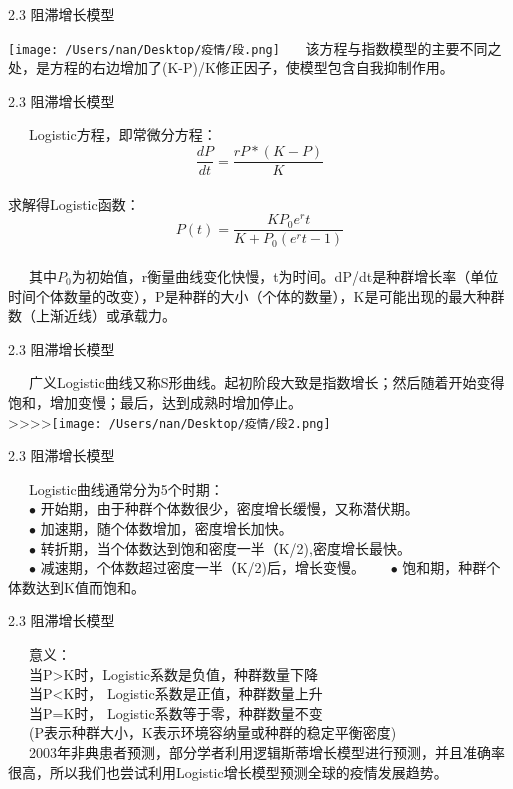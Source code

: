 \documentclass[
  ignorenonframetext,
]{beamer}
\begin{document}
\begin{frame}{2.3 阻滞增长模型}
\protect\hypertarget{section-9}{}

\texttt{[image: /Users/nan/Desktop/疫情/段.png]}
  该方程与指数模型的主要不同之处，是方程的右边增加了(K-P)/K修正因子，使模型包含自我抑制作用。

\end{frame}

\begin{frame}{2.3 阻滞增长模型}
\protect\hypertarget{section-10}{}

  Logistic方程，即常微分方程：
\[\frac {dP} {dt} =\frac  {rP*(K-P)} {K}\]\\
求解得Logistic函数： \[P(t)=\frac {KP_0 e^rt} {K+P_0(e^rt-1)}\]\\
  其中\(P_0\)为初始值，r衡量曲线变化快慢，t为时间。dP/dt是种群增长率（单位时间个体数量的改变），P是种群的大小（个体的数量），K是可能出现的最大种群数（上渐近线）或承载力。

\end{frame}

\begin{frame}{2.3 阻滞增长模型}
\protect\hypertarget{section-11}{}

  广义Logistic曲线又称S形曲线。起初阶段大致是指数增长；然后随着开始变得饱和，增加变慢；最后，达到成熟时增加停止。\\
\textgreater\textgreater\textgreater\textgreater{}\texttt{[image: /Users/nan/Desktop/疫情/段2.png]}

\end{frame}

\begin{frame}{2.3 阻滞增长模型}
\protect\hypertarget{section-12}{}

  Logistic曲线通常分为5个时期：\\
  \(\bullet\) 开始期，由于种群个体数很少，密度增长缓慢，又称潜伏期。\\
  \(\bullet\) 加速期，随个体数增加，密度增长加快。\\
  \(\bullet\) 转折期，当个体数达到饱和密度一半（K/2),密度增长最快。\\
  \(\bullet\) 减速期，个体数超过密度一半（K/2)后，增长变慢。
  \(\bullet\) 饱和期，种群个体数达到K值而饱和。

\end{frame}

\begin{frame}{2.3 阻滞增长模型}
\protect\hypertarget{section-13}{}

  意义：\\
  当P\textgreater K时，Logistic系数是负值，种群数量下降\\
  当P\textless K时， Logistic系数是正值，种群数量上升\\
  当P=K时， Logistic系数等于零，种群数量不变\\
  (P表示种群大小，K表示环境容纳量或种群的稳定平衡密度)\\
  2003年非典患者预测，部分学者利用逻辑斯蒂增长模型进行预测，并且准确率很高，所以我们也尝试利用Logistic增长模型预测全球的疫情发展趋势。

\end{frame}
\end{document}
